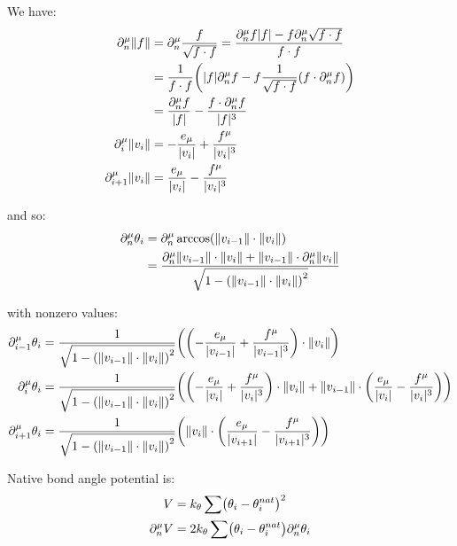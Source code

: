 \documentclass{article}
\DeclarePairedDelimiter{\brk}{(}{)}
\DeclarePairedDelimiter{\norm}{\lvert}{\rvert}
\DeclarePairedDelimiter{\normed}{\lVert}{\rVert}
\begin{document}
  We have:
  \begin{align*}
    \partial_n^\mu \normed{f} &= \partial_n^\mu \frac{f}{\sqrt{f \cdot f}} = \frac{\partial_n^\mu f |f| - f \partial_n^\mu \sqrt{f \cdot f}}{f \cdot f}\\
    &= \frac{1}{f \cdot f} \brk*{|f|\partial_n^\mu f - f \frac{1}{\sqrt{f \cdot f}}\brk*{f \cdot \partial_n^\mu f}}\\
    &= \frac{\partial_n^\mu f}{\norm{f}} - \frac{f \cdot \partial_n^\mu f}{\norm{f}^3}\\
    \partial_i^\mu \normed{v_i} &= -\frac{e_\mu}{\norm{v_i}} + \frac{f^\mu}{\norm{v_i}^3}\\
    \partial_{i+1}^\mu \normed{v_i} &= \frac{e_\mu}{\norm{v_i}} - \frac{f^\mu}{\norm{v_i}^3}
  \end{align*}

  and so:
  \begin{align*}
    \partial_n^\mu \theta_i &= \partial_n^\mu \arccos \brk*{\normed{v_{i-1}} \cdot \normed{v_i}}\\
    &= \frac{\partial_n^\mu \normed{v_{i-1}} \cdot \normed{v_i} + \normed{v_{i-1}} \cdot \partial_n^\mu \normed{v_i}}{\sqrt{1-\brk*{\normed{v_{i-1}} \cdot \normed{v_i}}^2}}
  \end{align*}

  with nonzero values:
  \begin{align*}
    \partial_{i-1}^\mu \theta_i &= \frac{1}{\sqrt{1-\brk*{\normed{v_{i-1}}\cdot \normed{v_i}}^2}}\brk*{\brk*{-\frac{e_\mu}{\norm{v_{i-1}}} + \frac{f^\mu}{\norm{v_{i-1}}^3}}\cdot \normed{v_i}}\\
    \partial_{i}^\mu \theta_i &= \frac{1}{\sqrt{1-\brk*{\normed{v_{i-1}}\cdot \normed{v_i}}^2}}\brk*{\brk*{-\frac{e_\mu}{\norm{v_i}} + \frac{f^\mu}{\norm{v_i}^3}}\cdot \normed{v_i}+\normed{v_{i-1}} \cdot \brk*{\frac{e_\mu}{\norm{v_i}} - \frac{f^\mu}{\norm{v_i}^3}}}\\
    \partial_{i+1}^\mu \theta_i &= \frac{1}{\sqrt{1-\brk*{\normed{v_{i-1}}\cdot \normed{v_i}}^2}}\brk*{\normed{v_i} \cdot \brk*{\frac{e_\mu}{\norm{v_{i+1}}} - \frac{f^\mu}{\norm{v_{i+1}}^3}}}
  \end{align*}

  Native bond angle potential is:
  \begin{align*}
    V &= k_\theta \sum \brk*{\theta_i - \theta_i^{nat}}^2\\
    \partial_n^\mu V &= 2k_\theta \sum \brk*{\theta_i - \theta_i^{nat}}\partial_n^\mu \theta_i
  \end{align*}
\end{document}
